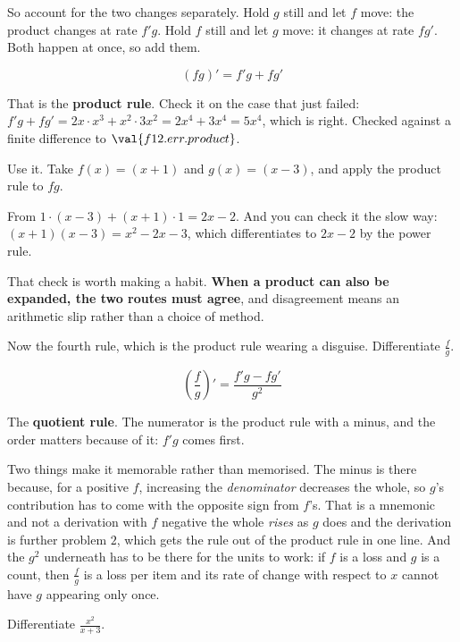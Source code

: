 \begin{fr}
So account for the two changes separately. Hold $g$ still and let $f$ move:
the product changes at rate $f'g$. Hold $f$ still and let $g$ move: it changes
at rate $fg'$. Both happen at once, so add them.

\[ (fg)' = f'g + fg' \]

That is the \textbf{product rule}. Check it on the case that just failed:
$f'g + fg' = 2x \cdot x^{3} + x^{2} \cdot 3x^{2} = 2x^{4} + 3x^{4} = 5x^{4}$,
which is right. Checked against a finite difference to
$\val{f12.err.product}$.

\end{fr}

\begin{fr}
Use it. Take $f(x) = (x+1)$ and $g(x) = (x-3)$, and apply the product rule
to $fg$.
\nextframe
\end{fr}

\begin{fr}
From $1 \cdot (x-3) + (x+1) \cdot 1 = 2x - 2$. And you can check it the slow
way: $(x+1)(x-3) = x^{2} - 2x - 3$, which differentiates to $2x - 2$ by the
power rule.

That check is worth making a habit. \textbf{When a product can also be
expanded, the two routes must agree}, and disagreement means an arithmetic
slip rather than a choice of method.

Now the fourth rule, which is the product rule wearing a disguise. Differentiate
$\frac{f}{g}$.
\dotline
\nextframe
\end{fr}

\begin{fr}
\begin{ansblock}
\[ \left(\frac{f}{g}\right)' = \frac{f'g - fg'}{g^{2}} \]
\end{ansblock}

The \textbf{quotient rule}. The numerator is the product rule with a minus,
and the order matters because of it: $f'g$ comes first.

Two things make it memorable rather than memorised. The minus is there
because, for a positive $f$, increasing the \emph{denominator} decreases the
whole, so $g$'s contribution has to come with the opposite sign from $f$'s.
That is a mnemonic and not a derivation \dash{} with $f$ negative the whole
\emph{rises} as $g$ does \dash{} and the derivation is further problem $2$,
which gets the rule out of the product rule in one line. And the $g^{2}$
underneath has to be there for the units to work: if $f$ is a loss and $g$ is
a count, then $\frac{f}{g}$ is a loss per item and its rate of change with
respect to $x$
cannot have $g$ appearing only once.

Differentiate $\frac{x^{2}}{x+3}$.
\nextframe
\end{fr}

